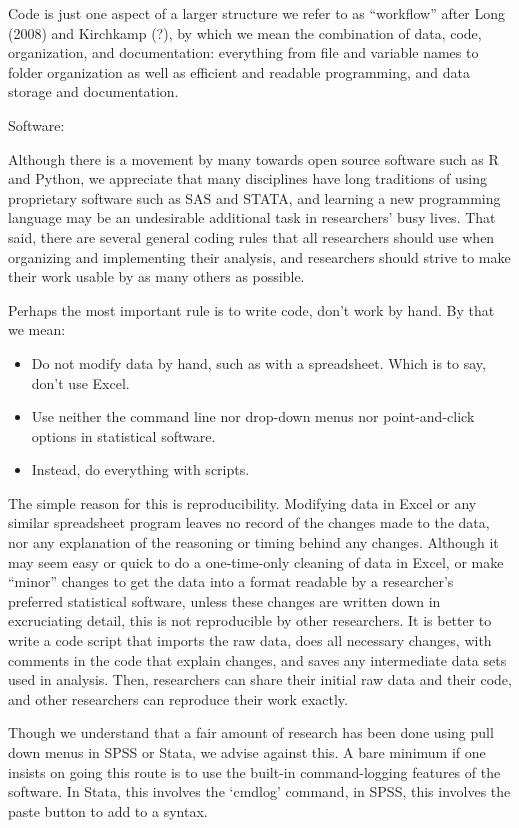 \documentclass[12pt] {article}
\begin{document}
Code is just one aspect of a larger structure we refer to as
``workflow'' after Long (2008) and Kirchkamp (?), by which we mean the
combination of data, code, organization, and documentation: everything
from file and variable names to folder organization as well as efficient
and readable programming, and data storage and documentation.

Software:

Although there is a movement by many towards open source software such
as R and Python, we appreciate that many disciplines have long
traditions of using proprietary software such as SAS and STATA, and
learning a new programming language may be an undesirable additional
task in researchers' busy lives. That said, there are several general
coding rules that all researchers should use when organizing and
implementing their analysis, and researchers should strive to make their
work usable by as many others as possible.

Perhaps the most important rule is to write code, don't work by hand. By
that we mean:

\begin{itemize}
\item
  Do not modify data by hand, such as with a spreadsheet. Which is to
  say, don't use Excel.
\item
  Use neither the command line nor drop-down menus nor point-and-click
  options in statistical software.
\item
  Instead, do everything with scripts.
\end{itemize}

The simple reason for this is reproducibility. Modifying data in Excel
or any similar spreadsheet program leaves no record of the changes made
to the data, nor any explanation of the reasoning or timing behind any
changes. Although it may seem easy or quick to do a one-time-only
cleaning of data in Excel, or make ``minor'' changes to get the data
into a format readable by a researcher's preferred statistical software,
unless these changes are written down in excruciating detail, this is
not reproducible by other researchers. It is better to write a code
script that imports the raw data, does all necessary changes, with
comments in the code that explain changes, and saves any intermediate
data sets used in analysis. Then, researchers can share their initial
raw data and their code, and other researchers can reproduce their work
exactly.

Though we understand that a fair amount of research has been done using
pull down menus in SPSS or Stata, we advise against this. A bare minimum
if one insists on going this route is to use the built-in
command-logging features of the software. In Stata, this involves the
`cmdlog' command, in SPSS, this involves the paste button to add to a
syntax.
\end{document}
